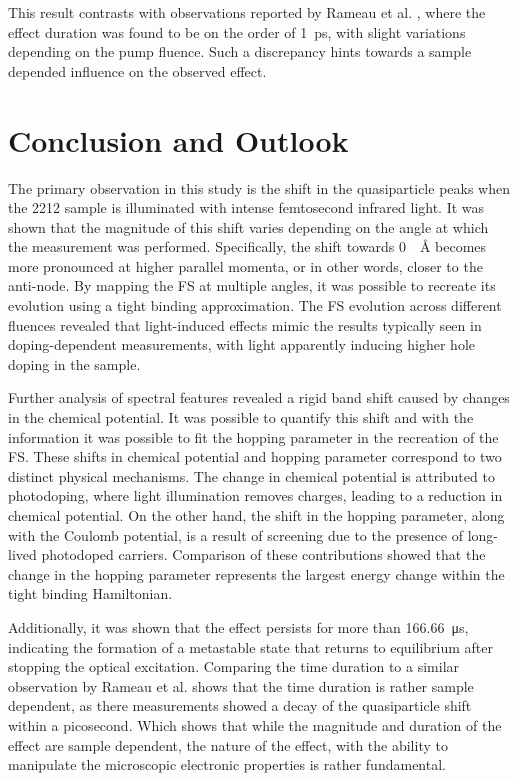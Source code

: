 This result contrasts with observations reported by Rameau et al. \cite{rameau_photoinduced_2014}, where the effect duration was found to be on the order of \qty{1}{\pico\second}, with slight variations depending on the pump fluence.
Such a discrepancy hints towards a sample depended influence on the observed effect.

\section{Conclusion and Outlook}

The primary observation in this study is the shift in the quasiparticle peaks when the 2212 sample is illuminated with intense femtosecond infrared light.
It was shown that the magnitude of this shift varies depending on the angle at which the measurement was performed.
Specifically, the shift towards \qty{0}{\per\angstrom} becomes more pronounced at higher parallel momenta, or in other words, closer to the anti-node.
By mapping the FS at multiple angles, it was possible to recreate its evolution using a tight binding approximation.
The FS evolution across different fluences revealed that light-induced effects mimic the results typically seen in doping-dependent measurements, with light apparently inducing higher hole doping in the sample.

Further analysis of spectral features revealed a rigid band shift caused by changes in the chemical potential.
It was possible to quantify this shift and with the information it was possible to fit the hopping parameter in the recreation of the FS.
These shifts in chemical potential and hopping parameter correspond to two distinct physical mechanisms.
The change in chemical potential is attributed to photodoping, where light illumination removes charges, leading to a reduction in chemical potential.
On the other hand, the shift in the hopping parameter, along with the Coulomb potential, is a result of screening due to the presence of long-lived photodoped carriers.
Comparison of these contributions showed that the change in the hopping parameter represents the largest energy change within the tight binding Hamiltonian.

Additionally, it was shown that the effect persists for more than \qty{166.66}{\micro\second}, indicating the formation of a metastable state that returns to equilibrium after stopping the optical excitation.
Comparing the time duration to a similar observation by Rameau et al. \cite{rameau_photoinduced_2014} shows that the time duration is rather sample dependent, as there measurements showed a decay of the quasiparticle shift within a picosecond.
Which shows that while the magnitude and duration of the effect are sample dependent, the nature of the effect, with the ability to manipulate the microscopic electronic properties is rather fundamental.

